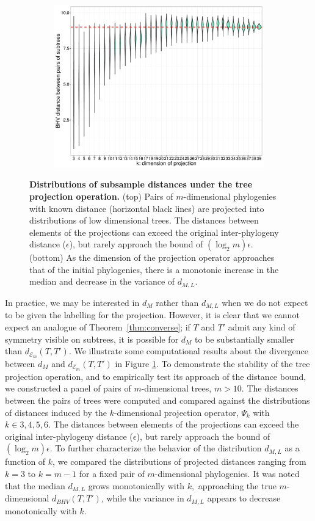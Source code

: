 \documentclass[a4paper,11pt]{article}
\newcommand{\aE}{\mathcal{E}}
\begin{document}
\begin{figure}
    \begin{subfigure}{\linewidth}
    \centering
    \includegraphics[width=0.8\linewidth]{../figures/dimred_pwdist_m40_vs_K.pdf}
    \end{subfigure}

    \caption{{\bf Distributions of subsample distances under the tree projection operation.} (top) Pairs of $m$-dimensional phylogenies with known distance (horizontal black lines) are projected into distributions of low dimensional trees. The distances between elements of the projections can exceed the original inter-phylogeny distance ($\epsilon$), but rarely approach the bound of $(\log_2 m)\epsilon$. (bottom) As the dimension of the projection operator approaches that of the initial phylogenies, there is a monotonic increase in the median and decrease in the variance of $d_{M,L}$.}
    \label{fig:dimred_calibration}
\end{figure}

In practice, we may be interested in $d_M$ rather than $d_{M,L}$ when we do not expect to be given the labelling for the projection.
However, it is clear that we cannot expect an analogue of Theorem~\ref{thm:converse}; if $T$ and $T'$ admit any kind of symmetry visible on subtrees, it is possible for $d_M$ to be substantially smaller than $d_{\aE_m}(T,T')$.
We illustrate some computational results about the divergence between $d_M$ and $d_{\aE_m}(T,T')$ in Figure \ref{fig:dimred_calibration}.
To demonstrate the stability of the tree projection operation, and to empirically test its approach of the distance bound, we constructed a panel of pairs of $m$-dimensional trees, $m > 10$.
The distances between the pairs of trees were computed and compared against the distributions of distances induced by the $k$-dimensional projection operator, $\Psi_k$ with $k \in {3,4,5,6}$.
The distances between elements of the projections can exceed the original inter-phylogeny distance ($\epsilon$), but rarely approach the bound of $(\log_2 m)\epsilon$.
To further characterize the behavior of the distribution $d_{M,L}$ as a function of $k$, we compared the distributions of projected distances ranging from $k=3$ to $k=m-1$ for a fixed pair of $m$-dimensional phylogenies.
It was noted that the median $d_{M,L}$ grows monotonically with $k,$ approaching the true $m$-dimensional $d_{BHV}(T, T')$, while the variance in $d_{M,L}$ appears to decrease monotonically with $k$.
\end{document}
